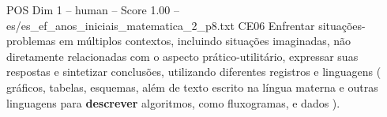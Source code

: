 \begin{textsample}{POS Dim 1 – human – Score 1.00 – es/es\_ef\_anos\_iniciais\_matematica\_2\_p8.txt}  \label{ex:f1_pos_017}
CE06 Enfrentar situações-problemas em múltiplos contextos, incluindo situações imaginadas, não diretamente relacionadas com o aspecto prático-utilitário, expressar suas respostas e sintetizar conclusões, utilizando diferentes registros e linguagens ( gráficos, tabelas, esquemas, além de texto escrito na língua materna e outras linguagens para \textbf{descrever} algoritmos, como fluxogramas, e dados ).

\end{textsample}
